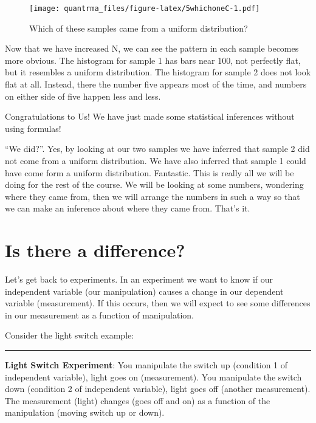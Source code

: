 \documentclass[
]{book}
\begin{document}
\begin{figure}
\centering
\texttt{[image: quantrma\_files/figure-latex/5whichoneC-1.pdf]}
\caption{\label{fig:5whichoneC}Which of these samples came from a uniform distribution?}
\end{figure}

Now that we have increased N, we can see the pattern in each sample becomes more obvious. The histogram for sample 1 has bars near 100, not perfectly flat, but it resembles a uniform distribution. The histogram for sample 2 does not look flat at all. Instead, there the number five appears most of the time, and numbers on either side of five happen less and less.

Congratulations to Us! We have just made some statistical inferences without using formulas!

``We did?''. Yes, by looking at our two samples we have inferred that sample 2 did not come from a uniform distribution. We have also inferred that sample 1 could have come form a uniform distribution. Fantastic. This is really all we will be doing for the rest of the course. We will be looking at some numbers, wondering where they came from, then we will arrange the numbers in such a way so that we can make an inference about where they came from. That's it.

\hypertarget{is-there-a-difference}{%
\section{Is there a difference?}\label{is-there-a-difference}}

Let's get back to experiments. In an experiment we want to know if our independent variable (our manipulation) causes a change in our dependent variable (measurement). If this occurs, then we will expect to see some differences in our measurement as a function of manipulation.

Consider the light switch example:

\begin{center}\rule{0.5\linewidth}{0.5pt}\end{center}

\textbf{Light Switch Experiment}: You manipulate the switch up (condition 1 of independent variable), light goes on (measurement). You manipulate the switch down (condition 2 of independent variable), light goes off (another measurement). The measurement (light) changes (goes off and on) as a function of the manipulation (moving switch up or down).
\end{document}
